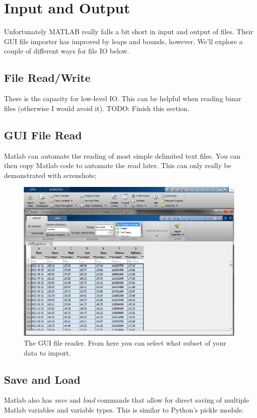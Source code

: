 
\pagebreak
\section{Input and Output}
Unfortunately MATLAB really falls a bit short in input and output of files.
 Their GUI file importer has improved by leaps and bounds, however.
 We'll explore a couple of different ways for file IO below.

\subsection{File Read/Write}
There is the capacity for low-level IO.
 This can be helpful when reading binar files (otherwise I would avoid it).
 TODO: Finish this section.

\begin{quote}

\end{quote}

\pagebreak
\subsection{GUI File Read}
Matlab can automate the reading of most simple delimited text files.
 You can then copy Matlab code to automate the read later.
 This can only really be demonstrated with screnshots;

\begin{figure}[ht!]
\centering
\includegraphics[width=120mm]{img/guiload.png}
\caption{The GUI file reader. From here you can select what subset of your data to import.}
\label{guiload}
\end{figure}

\pagebreak
\subsection{Save and Load}
Matlab also has \emph{save} and \emph{load} commands that allow for direct saving of multiple Matlab variables and variable types.
 This is similar to Python's pickle module.

\begin{quote}
 
\end{quote}
